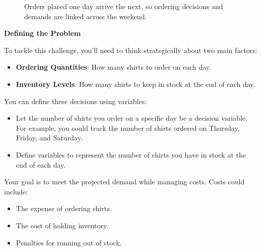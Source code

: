 \begin{figure}[h]
\centering
{}
\caption{Orders placed one day arrive the next, so ordering decisions and demands are linked across the weekend.}
\label{fig:shirt-timeline}
\end{figure}

\textbf{Defining the Problem}

To tackle this challenge, you’ll need to think strategically about two main factors:

\begin{itemize}
    \item \textbf{Ordering Quantities}: How many shirts to order on each day.
    \item \textbf{Inventory Levels}: How many shirts to keep in stock at the end of each day.
\end{itemize}

You can define these decisions using variables:
\begin{itemize}
    \item Let the number of shirts you order on a specific day be a decision variable. For example, you could track the number of shirts ordered on Thursday, Friday, and Saturday.
    \item Define variables to represent the number of shirts you have in stock at the end of each day.
\end{itemize}

Your goal is to meet the projected demand while managing costs. Costs could include:
\begin{itemize}
    \item The expense of ordering shirts.
    \item The cost of holding inventory.
    \item Penalties for running out of stock.
\end{itemize}

